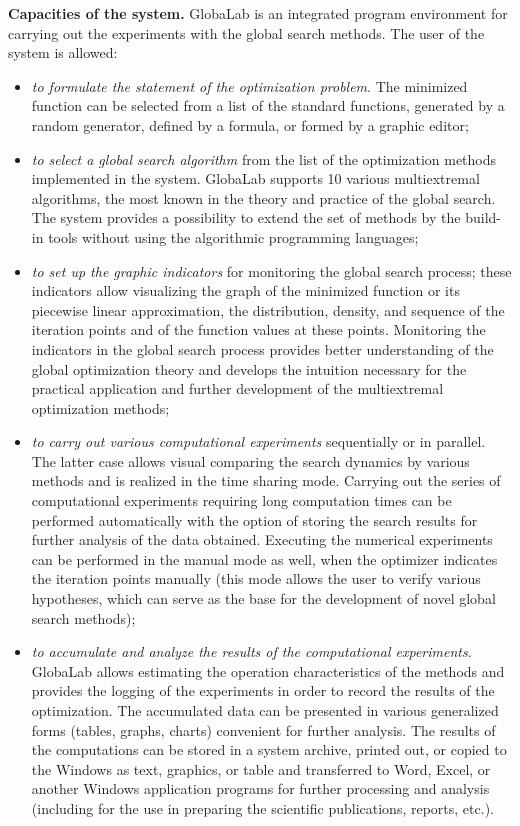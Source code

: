 \textbf{Capacities of the system.} GlobaLab is an integrated program environment for carrying out the experiments with the global search methods. The user of the system is allowed:

\begin{itemize}
\item \textit{to formulate the statement of the optimization problem}. The minimized function can be selected from a list of the standard functions, generated by a random generator, defined by a formula, or formed by a graphic editor;

\item \textit{to select a global search algorithm} from the list of the optimization methods implemented in the system. GlobaLab supports 10 various multiextremal algorithms, the most known in the theory and practice of the global search. The system provides a possibility to extend the set of methods by the build-in tools without using the algorithmic programming languages;

\item \textit{to set up the graphic indicators} for monitoring the global search process; these indicators allow visualizing the graph of the minimized function or its piecewise linear approximation, the distribution, density, and sequence of the iteration points and of the function values at these points. Monitoring the indicators in the global search process provides better understanding of the global optimization theory and develops the intuition necessary for the practical application and further development of the multiextremal optimization methods;

\item \textit{to carry out various computational experiments} sequentially or in parallel. The latter case allows visual comparing the search dynamics by various methods and is realized in the time sharing mode. Carrying out the series of computational experiments requiring long computation times can be performed automatically with the option of storing the search results for further analysis of the data obtained. Executing the numerical experiments can be performed in the manual mode as well, when the optimizer indicates the iteration points manually (this mode allows the user to verify various hypotheses, which can serve as the base for the development of novel global search methods);

\item \textit{to accumulate and analyze the results of the computational experiments}. GlobaLab allows estimating the operation characteristics of the methods and provides the logging of the experiments in order to record the results of the optimization. The accumulated data can be presented in various generalized forms (tables, graphs, charts) convenient for further analysis. The results of the computations can be stored in a system archive, printed out, or copied to the Windows as text, graphics, or table and transferred to Word, Excel, or another Windows application programs for further processing and analysis (including for the use in preparing the scientific publications, reports, etc.).
\end{itemize}


